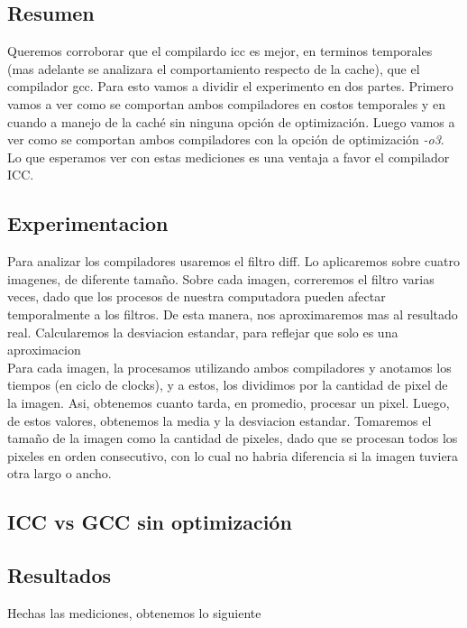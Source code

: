 \subsection{Resumen}
Queremos corroborar que el compilardo icc es mejor, en terminos temporales (mas adelante se analizara el comportamiento respecto de la cache), que el compilador gcc.
Para esto vamos a dividir el experimento en dos partes. Primero vamos a ver como se comportan ambos compiladores en costos temporales y en cuando a manejo de la caché sin ninguna opción de optimización. Luego vamos a ver como se comportan ambos compiladores con la opción de optimización \textit{-o3}. Lo que esperamos ver con estas mediciones es una ventaja a favor el compilador ICC.



\subsection{Experimentacion}
Para analizar los compiladores usaremos el filtro diff. Lo aplicaremos sobre cuatro imagenes, de diferente tamaño. Sobre cada imagen, correremos el filtro varias veces, dado que los procesos de nuestra computadora pueden afectar temporalmente a los filtros. De esta manera, nos aproximaremos mas al resultado real. Calcularemos la desviacion estandar, para reflejar que solo es una aproximacion \\
Para cada imagen, la procesamos utilizando ambos compiladores y anotamos los tiempos (en ciclo de clocks), y a estos, los dividimos por la cantidad de pixel de la imagen. Asi, obtenemos cuanto tarda, en promedio, procesar un pixel. Luego, de estos valores, obtenemos la media y la desviacion estandar. Tomaremos el tamaño de la imagen como la cantidad de pixeles, dado que se procesan todos los pixeles en orden consecutivo, con lo cual no habria diferencia si la imagen tuviera otra largo o ancho.

\subsection{ICC vs GCC sin optimización}

\subsection{Resultados}
Hechas las mediciones, obtenemos lo siguiente

